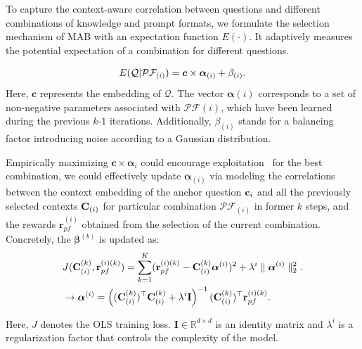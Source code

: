 \documentclass{article}
\theoremstyle{boldremark}
\begin{document}
To capture the context-aware correlation between questions and different combinations of knowledge and prompt formats, we formulate the selection mechanism of MAB with an expectation function $E(\cdot)$. It adaptively measures the potential expectation of a combination for different questions. 

\begin{equation}%
    E(\mathcal{Q}|\mathcal{P}\mathcal{F}_{(i)}) = \boldsymbol{c} \times \bm{\alpha}_{(i)} + \beta_{(i)}.
    \vspace{1mm}
\end{equation}
Here, $\boldsymbol{c}$ represents the embedding of $\mathcal{Q}$. The vector \textbf{$\bm{\alpha}{(i)}$} corresponds to a set of non-negative parameters associated with $\mathcal{P}\mathcal{F}{(i)}$, which have been learned during the previous $k$-$1$ iterations. Additionally, $\beta_{(i)}$ stands for a balancing factor introducing noise according to a Gaussian distribution.

Empirically maximizing $\boldsymbol{c} \times \bm{\alpha}_{i}$ could encourage exploitation~\cite{chen2019new,dong2023active} for the best combination, we could effectively update $\bm{\alpha}_{(i)}$ via modeling the correlations between the context embedding of the anchor question ${\bf c}_{i}$ and all the previously selected contexts ${\bf C}_{(i)}$ for particular combination $\mathcal{P}\mathcal{F}_{(i)}$ in former $k$ steps, and the rewards $\textbf{r}_{pf}^{(i)}$ obtained from the selection of the current combination. Concretely, the $\bm{\beta} ^{(b)}$ is updated as:
\begin{equation}%
\begin{aligned}
     & J({\bf C}_{(i)}^{(k)},\textbf{r}_{pf}^{(i)(k)}) =  \sum\limits_{k=1}^K(\textbf{r}_{pf}^{(i)(k)} - {\bf C}_{(i)}^{(k)} \bm{\alpha}^{(i)})^{2} + {\lambda}^{i}  \parallel  \bm{\alpha}^{(i)} \parallel _2^2. \\
     & \to \bm{\alpha}^{(i)} = \left( ({\bf C}_{(i)}^{(k)})^{\top} {\bf C}_{(i)}^{(k)} + {\lambda}^{i} \textbf{I} \right)^{-1} ({\bf C}_{(i)}^{(k)})^{\top} \textbf{r}_{pf}^{(i)(k)}.
\end{aligned}
\end{equation}

Here, $J$ denotes the OLS training loss. $\textbf{I}\in\mathbb{R}^{d \times d}$ is an identity matrix and $\lambda^{i}$ is a regularization factor that controls the complexity of the model.
\end{document}

